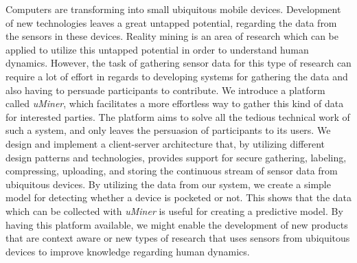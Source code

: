 
Computers are transforming into small ubiquitous mobile devices. Development of new technologies leaves a great untapped potential, regarding the data from the sensors in these devices. 
Reality mining is an area of research which can be applied to utilize this untapped potential in order to understand human dynamics. However, the task of gathering sensor data for this type of research can require a lot of effort in regards to developing systems for gathering the data and also having to persuade participants to contribute.
We introduce a platform called \emph{uMiner}, which facilitates a more effortless way to gather this kind of data for interested parties. The platform aims to solve all the tedious technical work of such a system, and only leaves the persuasion of participants to its users.
We design and implement a client-server architecture that, by utilizing different design patterns and technologies, provides support for secure gathering, labeling, compressing, uploading, and storing the continuous stream of sensor data from ubiquitous devices. 
By utilizing the data from our system, we create a simple model for detecting whether a device is pocketed or not. This shows that the data which can be collected with \emph{uMiner} is useful for creating a predictive model.  
By having this platform available, we might enable the development of new products that are context aware or new types of research that uses sensors from ubiquitous devices to improve knowledge regarding human dynamics.

